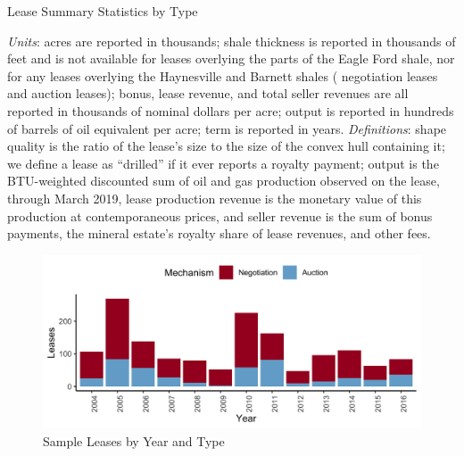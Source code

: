 \documentclass[12pt]{article}
\newcommand{\inputy}[1]{\unskip}
\begin{document}
\addtolength{\tabcolsep}{-3pt}
\begin{table}[htbp]
\begin{center}
\begin{threeparttable}
	\caption{Lease Summary Statistics by Type}
	\label{tab:summary_stats}
 	\small
	
	\footnotesize
    \begin{tablenotes}
    \item \textit{Units}: acres are reported in thousands; shale thickness is reported in thousands of feet and is not available for leases overlying the parts of the Eagle Ford shale, nor for any leases overlying the Haynesville and Barnett shales (\inputy{../output/estimates/Nsample_NEGOTIATION_NOTHICK.tex} negotiation leases and \inputy{../output/estimates/Nsample_AUCTION_NOTHICK.tex} auction leases); bonus, lease revenue, and total seller revenues are all reported in thousands of nominal dollars per acre; output is reported in hundreds of barrels of oil equivalent per acre; term is reported in years.  \textit{Definitions}: shape quality is the ratio of the lease's size to the size of the convex hull containing it; we define a lease as ``drilled'' if it ever reports a royalty payment; output is the BTU-weighted discounted sum of oil and gas production observed on the lease, through March 2019, lease production revenue is the monetary value of this production at contemporaneous prices, and seller revenue is the sum of bonus payments, the mineral estate's royalty share of lease revenues, and other fees. 
    \end{tablenotes}
\end{threeparttable}
\end{center}
\end{table}

\addtolength{\tabcolsep}{3pt}

\begin{figure}[H]
    \centering
    \caption{Sample Leases by Year and Type}
	\label{fig:cohorts}
	\includegraphics[width=1\textwidth]{../output/figures/cohorts.png}
\end{figure}
\end{document}
